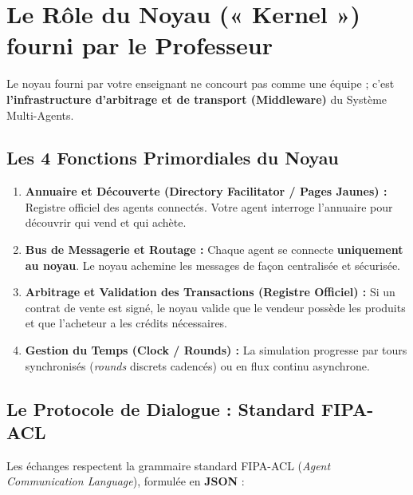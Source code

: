 \documentclass[11pt,a4paper]{article}
\begin{document}
\section{Le Rôle du Noyau (« Kernel ») fourni par le Professeur}

Le noyau fourni par votre enseignant ne concourt pas comme une équipe ; c'est \textbf{l'infrastructure d'arbitrage et de transport (Middleware)} du Système Multi-Agents.

\subsection{Les 4 Fonctions Primordiales du Noyau}
\begin{enumerate}[leftmargin=*, itemsep=2pt]
    \item \textbf{Annuaire et Découverte (Directory Facilitator / Pages Jaunes) :} Registre officiel des agents connectés. Votre agent interroge l'annuaire pour découvrir qui vend et qui achète.
    \item \textbf{Bus de Messagerie et Routage :} Chaque agent se connecte \textbf{uniquement au noyau}. Le noyau achemine les messages de façon centralisée et sécurisée.
    \item \textbf{Arbitrage et Validation des Transactions (Registre Officiel) :} Si un contrat de vente est signé, le noyau valide que le vendeur possède les produits et que l'acheteur a les crédits nécessaires.
    \item \textbf{Gestion du Temps (Clock / Rounds) :} La simulation progresse par tours synchronisés (\textit{rounds} discrets cadencés) ou en flux continu asynchrone.
\end{enumerate}

\subsection{Le Protocole de Dialogue : Standard FIPA-ACL}
Les échanges respectent la grammaire standard FIPA-ACL (\textit{Agent Communication Language}), formulée en \textbf{JSON} :
\end{document}
